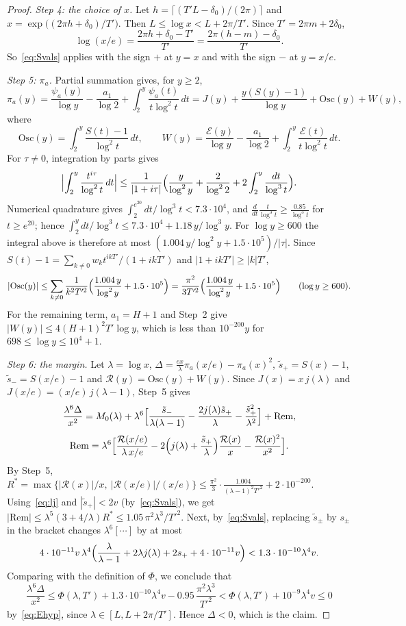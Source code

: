 \documentclass{amsart}
\theoremstyle{definition}
\theoremstyle{remark}
\theoremstyle{plain}
\numberwithin{equation}{section}
\newcommand{\Osc}{\mathrm{Osc}}
\newcommand{\Rem}{\mathrm{Rem}}
\begin{document}
\begin{proof}
\emph{Step 4: the choice of $x$.} Let $h=\lceil(T'L-\delta_0)/(2\pi)\rceil$ and $x=\exp\bigl((2\pi h+\delta_0)/T'\bigr)$. Then $L\le\log x<L+2\pi/T'$. Since $T'=2\pi m+2\delta_0$,
\[
\log(x/e)=\frac{2\pi h+\delta_0-T'}{T'}=\frac{2\pi(h-m)-\delta_0}{T'}.
\]
So~\eqref{eq:Svals} applies with the sign $+$ at $y=x$ and with the sign $-$ at $y=x/e$.

\emph{Step 5: $\pi_a$.} Partial summation gives, for $y\ge2$,
\[
\pi_a(y)=\frac{\psi_a(y)}{\log y}-\frac{a_1}{\log2}+\int_2^y\frac{\psi_a(t)}{t\log^2t}\,dt
=J(y)+\frac{y(S(y)-1)}{\log y}+\Osc(y)+W(y),
\]
where
\[
\Osc(y)=\int_2^y\frac{S(t)-1}{\log^2t}\,dt,\qquad
W(y)=\frac{\mathcal E(y)}{\log y}-\frac{a_1}{\log2}+\int_2^y\frac{\mathcal E(t)}{t\log^2t}\,dt.
\]
For $\tau\ne0$, integration by parts gives
\[
\Bigl|\int_2^y\frac{t^{i\tau}}{\log^2t}\,dt\Bigr|\le\frac{1}{|1+i\tau|}\Bigl(\frac{y}{\log^2y}+\frac{2}{\log^22}+2\int_2^y\frac{dt}{\log^3t}\Bigr).
\]
Numerical quadrature gives $\int_2^{e^{20}}dt/\log^3t<7.3\cdot10^4$, and $\frac{d}{dt}\frac{t}{\log^3t}\ge\frac{0.85}{\log^3t}$ for $t\ge e^{20}$; hence $\int_2^ydt/\log^3t\le7.3\cdot10^4+1.18\,y/\log^3y$. For $\log y\ge600$ the integral above is therefore at most $(1.004\,y/\log^2y+1.5\cdot10^5)/|\tau|$. Since $S(t)-1=\sum_{k\ne0}w_kt^{ikT'}/(1+ikT')$ and $|1+ikT'|\ge|k|T'$,
\[
|\Osc(y)|\le\sum_{k\ne0}\frac{1}{k^2T'^2}\Bigl(\frac{1.004\,y}{\log^2y}+1.5\cdot10^5\Bigr)=\frac{\pi^2}{3T'^2}\Bigl(\frac{1.004\,y}{\log^2y}+1.5\cdot10^5\Bigr)\qquad(\log y\ge600).
\]
For the remaining term, $a_1=H+1$ and Step~2 give $|W(y)|\le4(H+1)^2T'\log y$, which is less than $10^{-200}y$ for $698\le\log y\le10^4+1$.

\emph{Step 6: the margin.} Let $\lambda=\log x$, $\Delta=\frac{ex}{\lambda}\pi_a(x/e)-\pi_a(x)^2$, $\tilde s_+=S(x)-1$, $\tilde s_-=S(x/e)-1$ and $\mathcal R(y)=\Osc(y)+W(y)$. Since $J(x)=x\,j(\lambda)$ and $J(x/e)=(x/e)\,j(\lambda-1)$, Step~5 gives
\[
\frac{\lambda^6\Delta}{x^2}=M_0(\lambda)+\lambda^6\Bigl[\frac{\tilde s_-}{\lambda(\lambda-1)}-\frac{2j(\lambda)\tilde s_+}{\lambda}-\frac{\tilde s_+^2}{\lambda^2}\Bigr]+\Rem,
\]
\[
\Rem=\lambda^6\Bigl[\frac{\mathcal R(x/e)}{\lambda\,x/e}-2\Bigl(j(\lambda)+\frac{\tilde s_+}{\lambda}\Bigr)\frac{\mathcal R(x)}{x}-\frac{\mathcal R(x)^2}{x^2}\Bigr].
\]
By Step~5, $R^*=\max\{|\mathcal R(x)|/x,\ |\mathcal R(x/e)|/(x/e)\}\le\frac{\pi^2}{3}\cdot\frac{1.004}{(\lambda-1)^2T'^2}+2\cdot10^{-200}$. Using~\eqref{eq:lj} and $|\tilde s_+|<2v$ (by~\eqref{eq:Svals}), we get $|\Rem|\le\lambda^5(3+4/\lambda)R^*\le1.05\,\pi^2\lambda^3/T'^2$. Next, by~\eqref{eq:Svals}, replacing $\tilde s_\pm$ by $s_\pm$ in the bracket changes $\lambda^6[\cdots]$ by at most
\[
4\cdot10^{-11}v\,\lambda^4\Bigl(\frac{\lambda}{\lambda-1}+2\lambda j(\lambda)+2s_++4\cdot10^{-11}v\Bigr)<1.3\cdot10^{-10}\lambda^4v.
\]
Comparing with the definition of $\Phi$, we conclude that
\[
\frac{\lambda^6\Delta}{x^2}\le\Phi(\lambda,T')+1.3\cdot10^{-10}\lambda^4v-0.95\,\frac{\pi^2\lambda^3}{T'^2}<\Phi(\lambda,T')+10^{-9}\lambda^4v\le0
\]
by~\eqref{eq:Ehyp}, since $\lambda\in[L,L+2\pi/T']$. Hence $\Delta<0$, which is the claim.
\end{proof}
\end{document}
